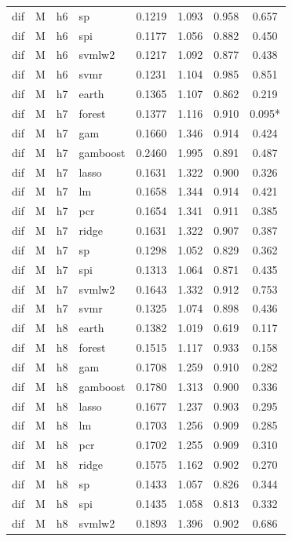 \begin{ThreePartTable}
\begin{longtable}[t]{llclcccc}
dif & M & h6 & sp & 0.1219 & 1.093 & 0.958 & 0.657\\
dif & M & h6 & spi & 0.1177 & 1.056 & 0.882 & 0.450\\
dif & M & h6 & svmlw2 & 0.1217 & 1.092 & 0.877 & 0.438\\
dif & M & h6 & svmr & 0.1231 & 1.104 & 0.985 & 0.851\\
\addlinespace
dif & M & h7 & earth & 0.1365 & 1.107 & 0.862 & 0.219\\
dif & M & h7 & forest & 0.1377 & 1.116 & 0.910 & 0.095*\\
dif & M & h7 & gam & 0.1660 & 1.346 & 0.914 & 0.424\\
dif & M & h7 & gamboost & 0.2460 & 1.995 & 0.891 & 0.487\\
dif & M & h7 & lasso & 0.1631 & 1.322 & 0.900 & 0.326\\
dif & M & h7 & lm & 0.1658 & 1.344 & 0.914 & 0.421\\
dif & M & h7 & pcr & 0.1654 & 1.341 & 0.911 & 0.385\\
dif & M & h7 & ridge & 0.1631 & 1.322 & 0.907 & 0.387\\
dif & M & h7 & sp & 0.1298 & 1.052 & 0.829 & 0.362\\
dif & M & h7 & spi & 0.1313 & 1.064 & 0.871 & 0.435\\
dif & M & h7 & svmlw2 & 0.1643 & 1.332 & 0.912 & 0.753\\
dif & M & h7 & svmr & 0.1325 & 1.074 & 0.898 & 0.436\\
\addlinespace
dif & M & h8 & earth & 0.1382 & 1.019 & 0.619 & 0.117\\
dif & M & h8 & forest & 0.1515 & 1.117 & 0.933 & 0.158\\
dif & M & h8 & gam & 0.1708 & 1.259 & 0.910 & 0.282\\
dif & M & h8 & gamboost & 0.1780 & 1.313 & 0.900 & 0.336\\
dif & M & h8 & lasso & 0.1677 & 1.237 & 0.903 & 0.295\\
dif & M & h8 & lm & 0.1703 & 1.256 & 0.909 & 0.285\\
dif & M & h8 & pcr & 0.1702 & 1.255 & 0.909 & 0.310\\
dif & M & h8 & ridge & 0.1575 & 1.162 & 0.902 & 0.270\\
dif & M & h8 & sp & 0.1433 & 1.057 & 0.826 & 0.344\\
dif & M & h8 & spi & 0.1435 & 1.058 & 0.813 & 0.332\\
dif & M & h8 & svmlw2 & 0.1893 & 1.396 & 0.902 & 0.686\\

\end{longtable}
\end{ThreePartTable}
